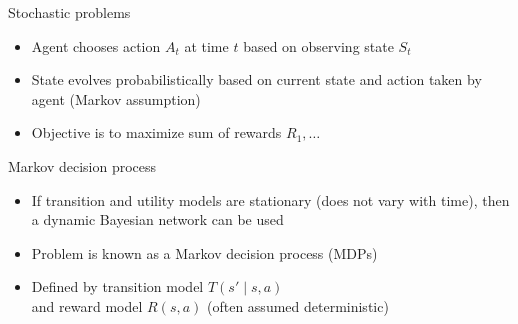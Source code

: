 \documentclass[handout]{dmu}
\subtitle{Markov Decision Processes and Bellman's Equation}
\begin{document}
\begin{frame}
\titlepage
\end{frame}


\begin{frame}{Stochastic problems}
\centering
{}
\vfill
\begin{itemize}
\item<1-> Agent chooses action $A_t$ at time $t$ based on observing state $S_t$
\item<2-> State evolves probabilistically based on current state and action taken by agent (\alert<2>{Markov assumption})
\item<3-> Objective is to maximize sum of rewards $R_1, \ldots$
\end{itemize}
\end{frame}

\begin{frame}{Markov decision process}
\centering
{}
\vfill
\begin{itemize}
\item<1-> If transition and utility models are stationary (does not vary with time), then a \alert<1>{dynamic Bayesian network} can be used
\item<2-> Problem is known as a \alert<2>{Markov decision process} (MDPs)
\item<3-> Defined by \alert<3>{transition model} $T(s' \mid s, a)$ \\ and \alert<3>{reward model} $R(s, a)$ (often assumed deterministic)
\end{itemize}
\end{frame}
\clearfoot
\end{document}
